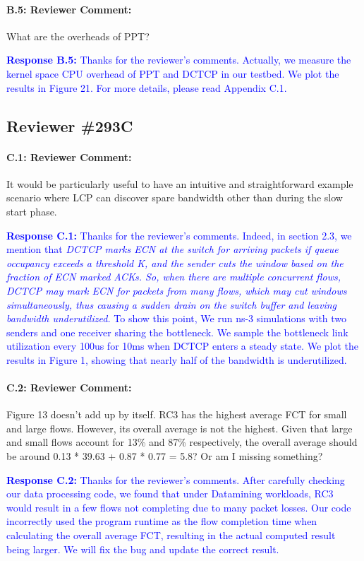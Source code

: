 \documentclass[12pt,one-column]{article}
\begin{document}
{\it \paragraph{B.5: Reviewer Comment:} What are the overheads of PPT?}

\noindent\textcolor{blue}{\textbf{Response B.5:}
Thanks for the reviewer’s comments. 
Actually, we measure the kernel space CPU overhead of PPT and DCTCP in our testbed.
We plot the results in Figure 21.
For more details, please read Appendix C.1.
}

\subsection{Reviewer \#293C}
{\it \paragraph{C.1: Reviewer Comment:} It would be particularly useful to have an intuitive and straightforward example scenario where LCP can discover spare bandwidth other than during the slow start phase.}

\noindent\textcolor{blue}{\textbf{Response C.1:}
Thanks for the reviewer’s comments. 
Indeed, in section 2.3, we mention that \emph{DCTCP marks ECN at the switch for arriving packets if queue occupancy exceeds a threshold K, and the sender cuts the window based on the fraction of ECN marked ACKs. So, when there are multiple concurrent flows, DCTCP may mark ECN for packets from many flows, which may cut windows simultaneously, thus causing a sudden drain on the switch buffer and leaving bandwidth underutilized.}
To show this point, We run ns-3 simulations with two senders and one receiver sharing the bottleneck. 
We sample the bottleneck link utilization every 100us for 10ms when DCTCP enters a steady state.
We plot the results in Figure 1, showing that nearly half of the bandwidth is underutilized.
}

{\it \paragraph{C.2: Reviewer Comment:} Figure 13 doesn’t add up by itself. RC3 has the highest average FCT for small and large flows. However, its overall average is not the highest. Given that large and small flows account for 13\% and 87\% respectively, the overall average should be around 0.13 * 39.63 + 0.87 * 0.77 = 5.8? Or am I missing something?}


\noindent\textcolor{blue}{\textbf{Response C.2:}
Thanks for the reviewer’s comments. 
After carefully checking our data processing code, we found that under Datamining workloads, RC3 would result in a few flows not completing due to many packet losses.
Our code incorrectly used the program runtime as the flow completion time when calculating the overall average FCT, resulting in the actual computed result being larger.
We will fix the bug and update the correct result.
}
\end{document}
